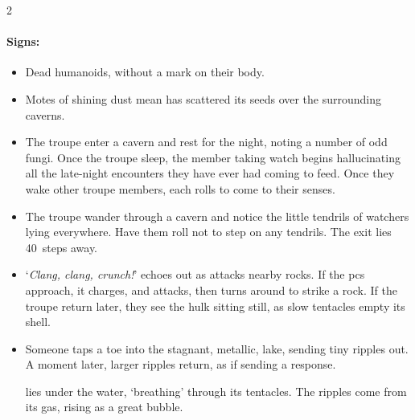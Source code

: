 \begin{multicols}{2}
\paragraph{Signs:}
\begin{itemize}
  \item
  Dead humanoids, without a mark on their body.
  \item
  Motes of shining dust mean  has scattered its seeds over the surrounding caverns.
\end{itemize}


\begin{itemize}
  \item
  The troupe enter a cavern and rest for the night, noting a number of odd fungi.
  Once the troupe sleep, the member taking watch begins hallucinating all the late-night encounters they have ever had coming to feed.
  Once they wake other troupe members, each rolls to come to their senses.
  \item
  The troupe wander through a cavern and notice the little tendrils of \glspl{watcher} lying everywhere.
  Have them roll  not to step on any tendrils.
  The exit lies 40~\glspl{step} away.
  \item
  `\textit{Clang, clang, crunch!}' echoes out as  attacks nearby rocks.
  If the \glspl{pc} approach, it charges, and attacks, then turns around to strike a rock.
  If the troupe return later, they see the \gls{hulk} sitting still, as slow tentacles empty its shell.
  \item
  Someone taps a toe into the stagnant, metallic, lake, sending tiny ripples out.
  A moment later, larger ripples return, as if sending a response.

   lies under the water, `breathing' through its tentacles.
  The ripples come from its gas, rising as a great bubble.
\end{itemize}

\end{multicols}

